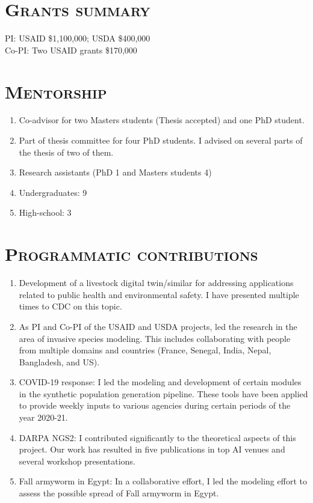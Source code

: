 \documentclass[margin,10pt]{res} %
\begin{document}
\begin{resume}
\section{\textnormal{\textsc{Grants summary}}}
PI: USAID \$1,100,000; USDA \$400,000\\
Co-PI: Two USAID grants \$170,000

\section{\textnormal{\textsc{Mentorship}}}
\begin{enumerate}[$\circ$]
    \item Co-advisor for two Masters students (Thesis accepted) and one PhD
    student.
    \item Part of thesis committee for four PhD students. I advised on
    several parts of the thesis of two of them.
    \item Research assistants (PhD 1 and Masters students 4)
    \item Undergraduates: 9
    \item High-school: 3
\end{enumerate}


\section{\textnormal{\textsc{Programmatic contributions}}}
\begin{enumerate}[$\circ$]
\item Development of a livestock digital twin/similar for addressing
applications related to public health and environmental safety.  I have
presented multiple times to CDC on this topic.
\item As PI and Co-PI of the USAID and USDA projects, led the
research in the area of invasive species modeling. This includes
collaborating with people from multiple domains and countries (France,
Senegal, India, Nepal, Bangladesh, and US).
\item COVID-19 response: I led the modeling and development of certain
modules in the synthetic population generation pipeline. These tools have
been applied to provide weekly inputs to various agencies during
certain periods of the year 2020-21.
\item DARPA NGS2: I contributed significantly to the theoretical aspects of
this project. Our work has resulted in five publications in top AI venues
and several workshop presentations.
\item Fall armyworm in Egypt: In a collaborative effort, I led the modeling
effort to assess the possible spread of Fall armyworm in Egypt.
\end{enumerate}


\end{resume}
\end{document}
